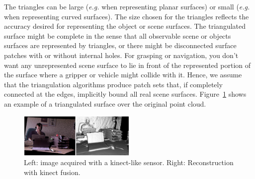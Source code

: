 \documentclass[twocolumn,oneside]{book}
\begin{document}
\begin{itemize}
  The triangles can be large ({\it e.g.} when representing planar
  surfaces) or small ({\it e.g.} when representing curved surfaces).
  The size chosen for the triangles reflects the accuracy desired for
  representing the object or scene surfaces.  The triangulated surface
  might be complete in the sense that all observable scene or objects
  surfaces are represented by triangles, or there might be
  disconnected surface patches with or without internal holes.  For
  grasping or navigation, you don't want any unrepresented scene
  surface to lie in front of the represented portion of the surface
  where a gripper or vehicle might collide with it.  Hence, we assume
  that the triangulation algorithms produce patch sets that, if
  completely connected at the edges, implicitly bound all real scene
  surfaces. Figure~\ref{timmesh} shows an example of a triangulated
  surface over the original point cloud.
\begin{figure}
    \includegraphics[width=0.5\textwidth]{BOOKFIGS/kinect_fusion}
\caption{Left: image acquired with a kinect-like sensor.
  Right: Reconstruction with kinect fusion. \label{timmesh}}
\end{figure}


\end{itemize}
\end{document}
